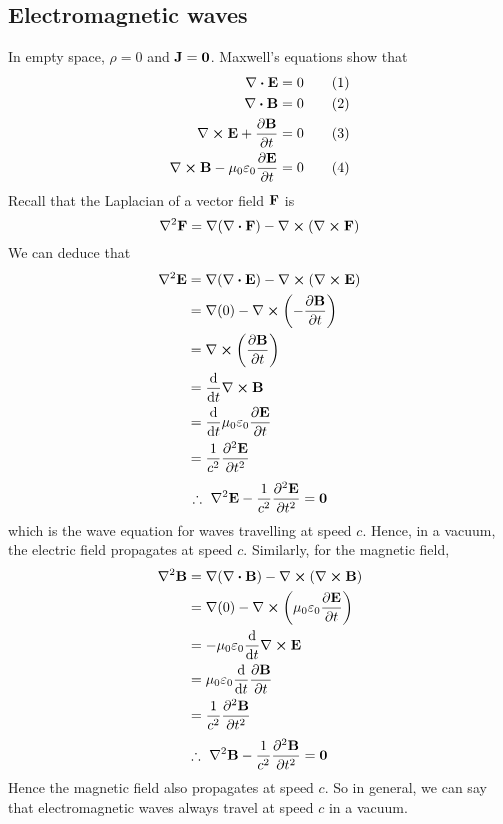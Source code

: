 \subsection{Electromagnetic waves}
In empty space, \(\rho = 0\) and \(\vb J = \vb 0\).
Maxwell's equations show that
\begin{align}
	\div{\vb E}                                       & = 0 \tag{1} \\
	\div{\vb B}                                       & = 0 \tag{2} \\
	\curl{\vb E} + \pdv{\vb B}{t}                     & = 0 \tag{3} \\
	\curl{\vb B} - \mu_0 \varepsilon_0 \pdv{\vb E}{t} & = 0 \tag{4}
\end{align}
Recall that the Laplacian of a vector field \(\vb F\) is
\[
	\laplacian \vb F = \grad(\div{\vb F}) - \curl(\curl{\vb F})
\]
We can deduce that
\begin{align*}
	\laplacian \vb E & = \grad(\div{\vb E}) - \curl(\curl{\vb E})  \\
	                 & = \grad(0) - \curl(-\pdv{\vb B}{t})         \\
	                 & = \curl(\pdv{\vb B}{t})                     \\
	                 & = \dv{t} \curl{\vb B}                       \\
	                 & = \dv{t} \mu_0 \varepsilon_0 \pdv{\vb E}{t} \\
	                 & = \frac{1}{c^2} \pdv[2]{\vb E}{t}
\end{align*}
\[
	\therefore\ \laplacian \vb E - \frac{1}{c^2} \pdv[2]{\vb E}{t} = \vb 0
\]
which is the wave equation for waves travelling at speed \(c\).
Hence, in a vacuum, the electric field propagates at speed \(c\).
Similarly, for the magnetic field,
\begin{align*}
	\laplacian \vb B & = \grad(\div{\vb B}) - \curl(\curl{\vb B})             \\
	                 & = \grad(0) - \curl(\mu_0 \varepsilon_0 \pdv{\vb E}{t}) \\
	                 & = -\mu_0\varepsilon_0 \dv{t} \curl{\vb E}              \\
	                 & = \mu_0\varepsilon_0 \dv{t} \pdv{\vb B}{t}             \\
	                 & = \frac{1}{c^2} \pdv[2]{\vb B}{t}
\end{align*}
\[
	\therefore\ \laplacian \vb B - \frac{1}{c^2} \pdv[2]{\vb B}{t} = \vb 0
\]
Hence the magnetic field also propagates at speed \(c\).
So in general, we can say that electromagnetic waves always travel at speed \(c\) in a vacuum.

